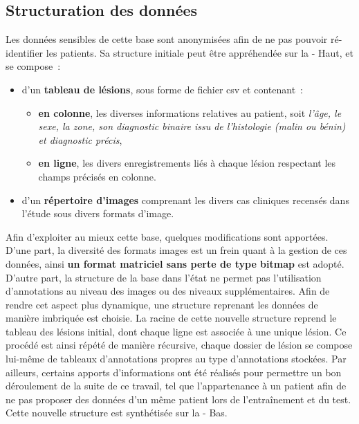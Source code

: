 \subsection{Structuration des données}
\label{sec:dataset_organisation}
Les données sensibles de cette base sont anonymisées afin de ne pas pouvoir ré-identifier les patients. Sa structure initiale peut être appréhendée sur la  - Haut, et se compose~:
\begin{itemize}
    \item d'un \textbf{tableau de lésions}, sous forme de fichier \gls{csv} et contenant~:
    \begin{itemize}
        \item \textbf{en colonne}, les diverses informations relatives au patient, soit \textit{l'âge, le sexe, la zone, son diagnostic binaire issu de l'histologie (malin ou bénin) et diagnostic précis},
        \item \textbf{en ligne}, les divers enregistrements liés à chaque lésion respectant les champs précisés en colonne.
    \end{itemize}
    \item d'un \textbf{répertoire d'images} comprenant les divers cas cliniques recensés dans l'étude sous divers formats d'image.
\end{itemize}\par

Afin d'exploiter au mieux cette base, quelques modifications sont apportées. D'une part, la diversité des formats images est un frein quant à la gestion de ces données, ainsi \textbf{un format matriciel sans perte de type bitmap} est adopté. D'autre part, la structure de la base dans l'état ne permet pas l'utilisation d'annotations au niveau des images ou des niveaux supplémentaires. Afin de rendre cet aspect plus dynamique, une structure reprenant les données de manière imbriquée est choisie. La racine de cette nouvelle structure reprend le tableau des lésions initial, dont chaque ligne est associée à une unique lésion. Ce procédé est ainsi répété de manière récursive, chaque dossier de lésion se compose lui-même de tableaux d'annotations propres au type d'annotations stockées. Par ailleurs, certains apports d'informations ont été réalisés pour permettre un bon déroulement de la suite de ce travail, tel que l'appartenance à un patient afin de ne pas proposer des données d'un même patient lors de l'entraînement et du test. Cette nouvelle structure est synthétisée sur la  - Bas.\par

